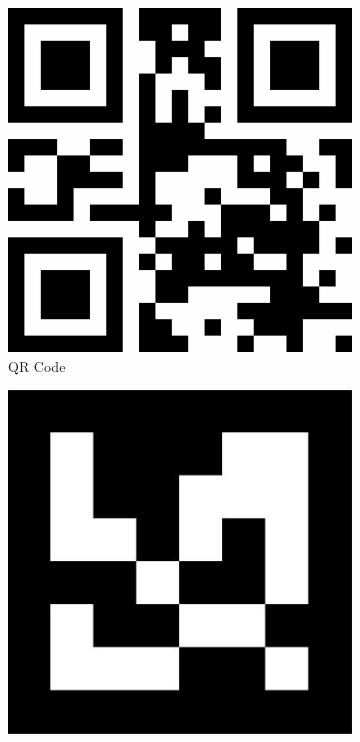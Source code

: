 \begin{figure}[ht]
    \centering
    \begin{subfigure}[b]{0.16\textwidth}
        \centering
        \includegraphics[width=\textwidth]{images/qr_code_example_cropped.png}
        \caption{QR Code}
        \label{subfig:qr_code}
    \end{subfigure}
    \begin{subfigure}[b]{0.16\textwidth}
        \centering
        \includegraphics[width=\textwidth]{images/artag_example_cropped.png}

\end{subfigure}
\end{figure}
